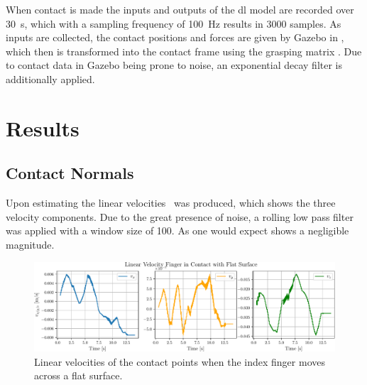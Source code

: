 When contact is made the inputs and outputs of the \gls{dl} model are recorded over \SI{30}{\second}, which with a sampling frequency of \SI{100}{\hertz} results in \num{3 000} samples. As inputs are collected, the contact positions and forces are given by Gazebo in , which then is transformed into the contact frame  using the grasping matrix . Due to contact data in Gazebo being prone to noise, an exponential decay filter is additionally applied.



\newpage
\section{Results}\label{sec:1-tactile-perception-results}

\subsection{Contact Normals}\label{sec:1-tactile-perception-results-contact-normals}

Upon estimating the linear velocities~ was produced, which shows the three velocity components. Due to the great presence of noise, a rolling low pass filter was applied with a window size of \num{100}. As one would expect  shows a negligible magnitude. \medskip

\begin{figure}[!h]
	\begin{center}
		\includegraphics[width=\textwidth]{chapters/1-tactile-perception/fig/matplotlib/linear-velocity-finger-in-contact-with-flat-surface.pdf}
	\end{center}
	\caption{Linear velocities of the contact points when the index finger moves across a flat surface.}
	\label{fig:linear-velocity-finger-in-contact-with-flat-surface}
\end{figure}

